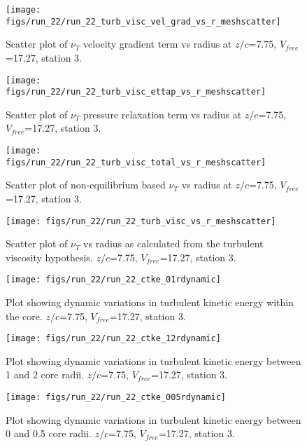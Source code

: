 \begin{figure}[H]
\centering
\texttt{[image: figs/run\_22/run\_22\_turb\_visc\_vel\_grad\_vs\_r\_meshscatter]}
\caption{Scatter plot of $\nu_T$ velocity gradient term vs radius at $z/c$=7.75, $V_{free}$=17.27, station 3.}
\end{figure}


\begin{figure}[H]
\centering
\texttt{[image: figs/run\_22/run\_22\_turb\_visc\_ettap\_vs\_r\_meshscatter]}
\caption{Scatter plot of $\nu_T$ pressure relaxation term vs radius at $z/c$=7.75, $V_{free}$=17.27, station 3.}
\end{figure}


\begin{figure}[H]
\centering
\texttt{[image: figs/run\_22/run\_22\_turb\_visc\_total\_vs\_r\_meshscatter]}
\caption{Scatter plot of non-equilibrium based $\nu_T$ vs radius at $z/c$=7.75, $V_{free}$=17.27, station 3.}
\end{figure}


\begin{figure}[H]
\centering
\texttt{[image: figs/run\_22/run\_22\_turb\_visc\_vs\_r\_meshscatter]}
\caption{Scatter plot of $\nu_T$ vs radius as calculated from the turbulent viscosity hypothesis. $z/c$=7.75, $V_{free}$=17.27, station 3.}
\end{figure}


\begin{figure}[H]
\centering
\texttt{[image: figs/run\_22/run\_22\_ctke\_01rdynamic]}
\caption{Plot showing dynamic variations in turbulent kinetic energy within the core. $z/c$=7.75, $V_{free}$=17.27, station 3.}
\end{figure}


\begin{figure}[H]
\centering
\texttt{[image: figs/run\_22/run\_22\_ctke\_12rdynamic]}
\caption{Plot showing dynamic variations in turbulent kinetic energy between 1 and 2 core radii. $z/c$=7.75, $V_{free}$=17.27, station 3.}
\end{figure}


\begin{figure}[H]
\centering
\texttt{[image: figs/run\_22/run\_22\_ctke\_005rdynamic]}
\caption{Plot showing dynamic variations in turbulent kinetic energy between 0 and 0.5 core radii. $z/c$=7.75, $V_{free}$=17.27, station 3.}
\end{figure}



